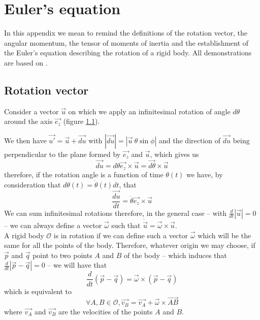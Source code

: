 \documentclass[class=report, float=false, crop=false]{standalone}
\begin{document}
\chapter{Euler's equation}
\label{appendix:euler}

In this appendix we mean to remind the definitions of the rotation vector, the angular momentum, the tensor of moments of inertia and the establishment of the Euler's equation describing the rotation of a rigid body. All demonstrations are based on \cite{landau1972mechanics}.

\section{Rotation vector}

Consider a vector $\vec{u}$ on which we apply an infinitesimal rotation of angle $d\theta$ around the axis $\vec{e_z}$ (figure \ref{inf_rotation_fig}).\\

\begin{figure}[h!]
\centering

\caption{}
\label{inf_rotation_fig}
\end{figure}

We then have $\vec{u'} = \vec{u} + \vec{du}$ with $|\vec{du}| = |\vec{u} ~\theta \sin\phi|$ and the direction of $\vec{du}$ being perpendicular to the plane formed by $\vec{e_z}$ and $\vec{u}$, which gives us
\begin{equation}
\vec{du} = d\theta \vec{e_z} \times \vec{u} = \vec{d\theta} \times \vec{u}
\label{inf_rotation}
\end{equation}
therefore, if the rotation angle is a function of time $\theta(t)$ we have, by consideration that $d\theta(t) = \dot{\theta}(t)dt$, that
\begin{equation}
\frac{\vec{du}}{dt} = \dot{\theta}\vec{e_z} \times \vec{u}
\end{equation}
We can sum infinitesimal rotations therefore, in the general case -- with $\frac{d}{dt}|\vec{u}| = 0$ -- we can always define a vector $\vec{\omega}$ such that $\dot{\vec{u}} = \vec{\omega} \times \vec{u}$.\\

A rigid body $\mathcal{O}$ is in rotation if we can define such a vector $\vec{\omega}$ which will be the same for all the points of the body. Therefore, whatever origin we may choose, if $\vec{p}$ and $\vec{q}$ point to two points $A$ and $B$ of the body -- which induces that $\frac{d}{dt} |\vec{p} - \vec{q}| = 0$ -- we will have that
\begin{equation}
\frac{d}{dt} \left( \vec{p} - \vec{q} \right) = \vec{\omega} \times \left( \vec{p} - \vec{q} \right)
\end{equation}
which is equivalent to
\begin{equation}
\forall A,B \in \mathcal{O}, \vec{v_B} = \vec{v_A} + \vec{\omega} \times \vec{AB}
\label{comp_vitesse}
\end{equation}
where $\vec{v_A}$ and $\vec{v_B}$ are the velocities of the points $A$ and $B$.
\end{document}
